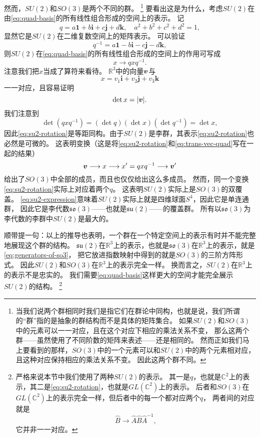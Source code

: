 \documentclass[hyperref, UTF8, a4paper]{ctexart}
\newcommand*{\reals}{\mathbb{R}}
\newcommand*{\complexes}{\mathbb{C}}
\begin{document}
然而，$SU(2)$和$SO(3)$是两个不同的群。%
\footnote{当我们说两个群相同时我们是指它们在群论中同构，也就是说，我们所谓的“群”指的是抽象的群结构而不是具体的矩阵集合。
如果$SU(2)$和$SO(3)$中的元素可以一一对应，且在这个对应下相应的乘法关系不变，
那么这两个群——虽然使用了不同阶数的矩阵来表述——还是相同的。
然而正如我们马上要看到的那样，$SO(3)$中的一个元素可以和$SU(2)$中的两个元素相对应，且这种对应保持相应的乘法关系不变。
因此这两个群不同。}%
要看出这是为什么，考虑$SU(2)$在由\eqref{eq:quad-basis}的所有线性组合形成的空间上的表示。
记
\[
    q = a \mathbf{1} + b \mathbf{i} + c \mathbf{j} + d \mathbf{k}, \quad a^2 + b^2 + c^2 + d^2 = 1,
\]
显然它是$SU(2)$在二维复数空间上的矩阵表示。
可以验证
\[
    q^{-1} = a \mathbf{1} - b \mathbf{i} - c \mathbf{j} - d \mathbf{k},
\]
则$SU(2)$在\eqref{eq:quad-basis}的所有线性组合形成的空间上的作用可写成
\begin{equation}
    x \longrightarrow q x q^{-1}.
    \label{eq:su2-rotation}
\end{equation}
注意我们把$x$当成了算符来看待。
$\reals^3$中的向量$\vb*{v}$与
\begin{equation}
    x = v_1 \mathbf{i} + v_2 \mathbf{j} + v_3 \mathbf{k}
    \label{eq:trans-vec-quad}
\end{equation}
一一对应，且容易证明
\[
    \det x = \abs{\vb*{v}}.
\]
我们注意到
\[
    \det (q x q^{-1}) = (\det q) (\det x) (\det q^{-1}) = \det x,
\]
因此\eqref{eq:su2-rotation}是等距同构。由于$SU(2)$是李群，其表示\eqref{eq:su2-rotation}也必然是可微的。
这表明变换（这是将\eqref{eq:su2-rotation}和\eqref{eq:trans-vec-quad}写在一起的结果）
\[
    \vb*{v} \longrightarrow x \longrightarrow x' = q x q^{-1} \longrightarrow \vb*{v}'
\]
给出了$SO(3)$中全部的成员，而且也仅仅给出这么多成员。
然而，同一个变换\eqref{eq:su2-rotation}实际上对应着两个$q$。
这表明$SU(2)$实际上是$SO(3)$的双覆盖。
\eqref{eq:su2-expression}意味着$SU(2)$实际上就是四维球面$S^4$，因此它是单连通群，
因此它是李代数$\mathfrak{so}(3)$——也就是$\mathfrak{su}(2)$——的覆盖群。
所有以$\mathfrak{so}(3)$为李代数的李群中$SU(2)$是最大的。

顺带提一句：以上的推导也表明，一个群在一个特定空间上的表示有时并不能完整地展现这个群的结构。
$\mathfrak{su}(2)$在$\reals^3$上的表示，也就是$\mathfrak{so}(3)$在$\reals^3$上的表示，就是\eqref{eq:generators-of-so3}，
把它放进指数映射中得到的就是$SO(3)$的三阶方阵形式。
因此$SU(2)$和$SO(3)$在$\reals^3$上的表示完全一样。
换而言之，$SU(2)$在$\reals^3$上的表示不是忠实的。
我们需要\eqref{eq:quad-basis}这样更大的空间才能完全展示$SU(2)$的结构。%
\footnote{严格来说本节中我们使用了两种$SU(2)$的表示。
其一是$q$，也就是$\complexes^2$上的表示，其二是\eqref{eq:su2-rotation}，也就是$GL(\complexes^2)$上的表示。
后者和$SO(3)$在$GL(\complexes^2)$上的表示完全一样，但后者中的每一个都对应两个$q$，
两者间的对应就是
\[
    \hat{B} \longrightarrow \hat{A} \hat{B} \hat{A}^{-1},
\]
它并非一一对应。}
\end{document}
